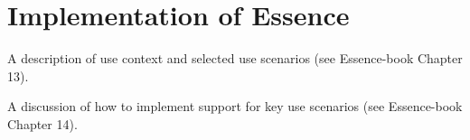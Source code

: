\section{Implementation of Essence}
A description of use context and selected use scenarios (see Essence-book Chapter 13).

A discussion of how to implement support for key use scenarios (see Essence-book Chapter 14).
